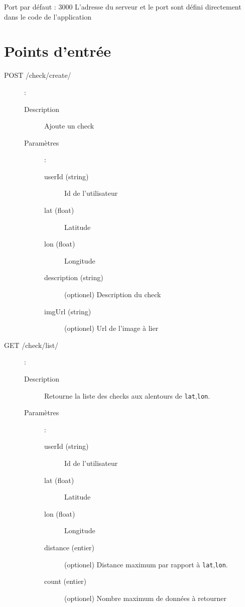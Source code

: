 \documentclass[a4paper,12pt]{report}
\begin{document}
\begin{onehalfspace}
Port par défaut : 3000\newline
L'adresse du serveur et le port sont défini directement dans le code de l'application

\section{Points d'entrée}
\begin{description}
  \item[POST /check/create/]:

    \begin{description}
      \item[Description] Ajoute un check
      \item[Paramètres]:

        \begin{description}
          \item[userId (string)] Id de l'utilisateur
          \item[lat (float)] Latitude
          \item[lon (float)] Longitude
          \item[description (string)] (optionel) Description du check
          \item[imgUrl (string)] (optionel) Url de l'image à lier
        \end{description}
    \end{description}

  \item[GET /check/list/]:

    \begin{description}
      \item[Description] Retourne la liste des checks aux alentours de \lstinline{lat},\lstinline{lon}.

      \item[Paramètres]:
        \begin{description}
          \item[userId (string)] Id de l'utilisateur
          \item[lat (float)] Latitude
          \item[lon (float)] Longitude
          \item[distance (entier)] (optionel) Distance maximum par rapport à \lstinline{lat},\lstinline{lon}.
          \item[count (entier)] (optionel) Nombre maximum de données à retourner
        \end{description}
    \end{description}


\end{description}
\end{onehalfspace}
\end{document}
